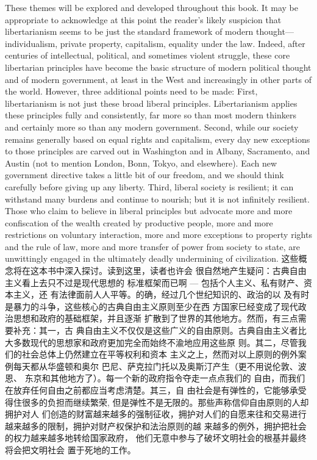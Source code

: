 \begin{paracol}{2}
\switchcolumn*
These themes will be explored and developed throughout
this book. It may be appropriate to acknowledge at this point the reader's likely suspicion that libertarianism seems to be just
the standard framework of modern thought---individualism,
private property, capitalism, equality under the law. Indeed,
after centuries of intellectual, political, and sometimes violent
struggle, these core libertarian principles have become the basic
structure of modern political thought and of modern government, at least in the West and increasingly in other parts of the
world. However, three additional points need to be made: First,
libertarianism is not just these broad liberal principles. Libertarianism applies these principles fully and consistently, far more so
than most modern thinkers and certainly more so than any
modern government. Second, while our society remains generally based on equal rights and capitalism, every day new exceptions to those principles are carved out in Washington and in
Albany, Sacramento, and Austin (not to mention London,
Bonn, Tokyo, and elsewhere). Each new government directive
takes a little bit of our freedom, and we should think carefully
before giving up any liberty. Third, liberal society is resilient; it
can withstand many burdens and continue to nourish; but it is
not infinitely resilient. Those who claim to believe in liberal
principles but advocate more and more confiscation of the
wealth created by productive people, more and more restrictions on voluntary interaction, more and more exceptions to
property rights and the rule of law, more and more transfer of
power from society to state, are unwittingly engaged in the ultimately deadly undermining of civilization.
\switchcolumn
这些概念将在这本书中深入探讨。读到这里，读者也许会
很自然地产生疑问：古典自由主义看上去只不过是现代思想的
标准框架而已啊 --- 包括个人主义、私有财产、资本主义，还
有法律面前人人平等。的确，经过几个世纪知识的、政治的以
及有时是暴力的斗争，这些核心的古典自由主义原则至少在西
方国家巳经变成了现代政治思想和政府的基础框架，并且逐渐
扩散到了世界的其他地方。然而，有三点需要补充：其一，古
典自由主义不仅仅是这些广义的自由原则。古典自由主义者比
大多数现代的思想家和政府更加完全而始终不渝地应用这些原
则。其二，尽管我们的社会总体上仍然建立在平等权利和资本
主义之上，然而对以上原则的例外案例每天都从华盛顿和奥尔
巴尼、萨克拉门托以及奥斯汀产生（更不用说伦敦、波恩、
东京和其他地方了）。每一个新的政府指令夺走一点点我们的
自由，而我们在放弃任何自由之前都应当考虑清楚。其三，自
由社会是有弹性的，它能够承受得住很多的负担而继续繁荣,
但是弹性不是无限的。那些声称信仰自由原则的人却拥护对人
们创造的财富越来越多的强制征收，拥护对人们的自愿来往和交易进行越来越多的限制，拥护对财产权保护和法治原则的越
来越多的例外，拥护把社会的权力越来越多地转给国家政府，
他们无意中参与了破坏文明社会的根基并最终将会把文明社会
置于死地的工作。



\end{paracol}
